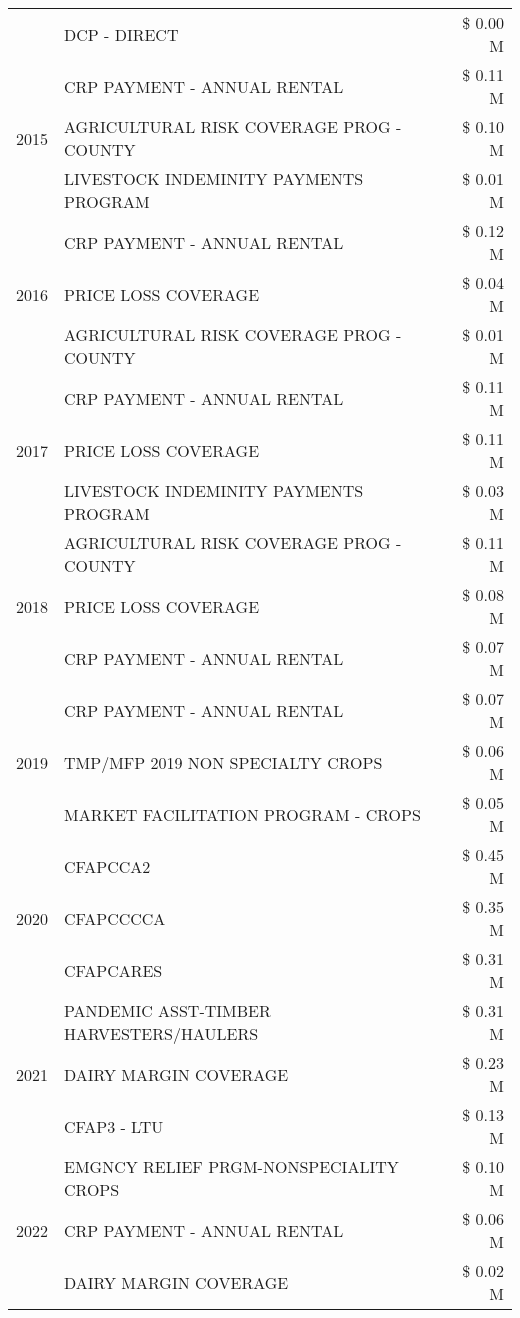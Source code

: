 \begin{tabular}{llr}
 & DCP - DIRECT & \$ 0.00 M \\
\cline{1-3}
\multirow[t]{3}{*}{2015} & CRP PAYMENT - ANNUAL RENTAL & \$ 0.11 M \\
 & AGRICULTURAL RISK COVERAGE PROG - COUNTY & \$ 0.10 M \\
 & LIVESTOCK INDEMINITY PAYMENTS PROGRAM & \$ 0.01 M \\
\cline{1-3}
\multirow[t]{3}{*}{2016} & CRP PAYMENT - ANNUAL RENTAL & \$ 0.12 M \\
 & PRICE LOSS COVERAGE & \$ 0.04 M \\
 & AGRICULTURAL RISK COVERAGE PROG - COUNTY & \$ 0.01 M \\
\cline{1-3}
\multirow[t]{3}{*}{2017} & CRP PAYMENT - ANNUAL RENTAL & \$ 0.11 M \\
 & PRICE LOSS COVERAGE & \$ 0.11 M \\
 & LIVESTOCK INDEMINITY PAYMENTS PROGRAM & \$ 0.03 M \\
\cline{1-3}
\multirow[t]{3}{*}{2018} & AGRICULTURAL RISK COVERAGE PROG - COUNTY & \$ 0.11 M \\
 & PRICE LOSS COVERAGE & \$ 0.08 M \\
 & CRP PAYMENT - ANNUAL RENTAL & \$ 0.07 M \\
\cline{1-3}
\multirow[t]{3}{*}{2019} & CRP PAYMENT - ANNUAL RENTAL & \$ 0.07 M \\
 & TMP/MFP 2019 NON SPECIALTY CROPS & \$ 0.06 M \\
 & MARKET FACILITATION PROGRAM - CROPS & \$ 0.05 M \\
\cline{1-3}
\multirow[t]{3}{*}{2020} & CFAPCCA2 & \$ 0.45 M \\
 & CFAPCCCCA & \$ 0.35 M \\
 & CFAPCARES & \$ 0.31 M \\
\cline{1-3}
\multirow[t]{3}{*}{2021} & PANDEMIC ASST-TIMBER HARVESTERS/HAULERS & \$ 0.31 M \\
 & DAIRY MARGIN COVERAGE & \$ 0.23 M \\
 & CFAP3 - LTU & \$ 0.13 M \\
\cline{1-3}
\multirow[t]{3}{*}{2022} & EMGNCY RELIEF PRGM-NONSPECIALITY CROPS & \$ 0.10 M \\
 & CRP PAYMENT - ANNUAL RENTAL & \$ 0.06 M \\
 & DAIRY MARGIN COVERAGE & \$ 0.02 M \\
\cline{1-3}
\bottomrule
\end{tabular}
